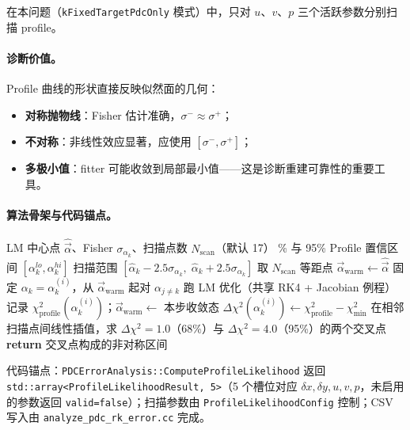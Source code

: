 \documentclass[a4paper, 11pt]{article}
\begin{document}
在本问题（\texttt{kFixedTargetPdcOnly} 模式）中，只对 $u$、$v$、$p$ 三个活跃参数分别扫描 profile。

\paragraph{诊断价值。}
Profile 曲线的形状直接反映似然面的几何：
\begin{itemize}[nosep]
  \item \textbf{对称抛物线}：Fisher 估计准确，$\sigma^- \approx \sigma^+$；
  \item \textbf{不对称}：非线性效应显著，应使用 $[\sigma^-, \sigma^+]$；
  \item \textbf{多极小值}：fitter 可能收敛到局部最小值——这是诊断重建可靠性的重要工具。
\end{itemize}

\paragraph{算法骨架与代码锚点。}

\begin{algorithm}[H]
\caption{方法三：Profile Likelihood 扫描（针对参数 $\alpha_k$）}
\label{alg:profile}
\begin{algorithmic}[1]
\Require LM 中心点 $\hat{\vec{\alpha}}$、Fisher $\sigma_{\alpha_k}$、扫描点数 $N_\mathrm{scan}$（默认 17）
\% 与 95\% Profile 置信区间 $[\alpha_k^{lo}, \alpha_k^{hi}]$
\State 扫描范围 $[\hat{\alpha}_k - 2.5\sigma_{\alpha_k},\; \hat{\alpha}_k + 2.5\sigma_{\alpha_k}]$ 取 $N_\mathrm{scan}$ 等距点
\State $\vec{\alpha}_\mathrm{warm} \gets \hat{\vec{\alpha}}$ 
  \State 固定 $\alpha_k = \alpha_k^{(i)}$，从 $\vec{\alpha}_\mathrm{warm}$ 起对 $\alpha_{j \neq k}$ 跑 LM 优化（共享 RK4 + Jacobian 例程）
  \State 记录 $\chi^2_\mathrm{profile}(\alpha_k^{(i)})$；$\vec{\alpha}_\mathrm{warm} \gets$ 本步收敛态
\EndFor
\State $\Delta\chi^2(\alpha_k^{(i)}) \gets \chi^2_\mathrm{profile} - \chi^2_\mathrm{min}$
\State 在相邻扫描点间线性插值，求 $\Delta\chi^2 = 1.0$（68\%）与 $\Delta\chi^2 = 4.0$（95\%）的两个交叉点
\State \textbf{return} 交叉点构成的非对称区间
\end{algorithmic}
\end{algorithm}

代码锚点：\texttt{PDCErrorAnalysis::ComputeProfileLikelihood} 返回 \texttt{std::array<ProfileLikelihoodResult, 5>}（5 个槽位对应 $\delta x, \delta y, u, v, p$，未启用的参数返回 \texttt{valid=false}）；扫描参数由 \texttt{ProfileLikelihoodConfig} 控制；CSV 写入由 \texttt{analyze\_pdc\_rk\_error.cc} 完成。
\end{document}
